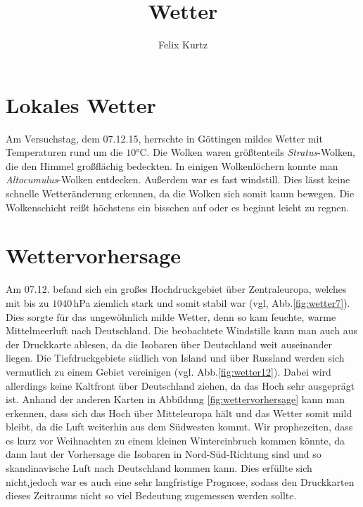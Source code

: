 \documentclass[12pt,a4paper,headinclude,bibtotoc]{scrartcl}
\begin{document}
\title{Wetter}
\author{Felix Kurtz}
\maketitle

\section{Lokales Wetter}
Am Versuchstag, dem 07.12.15, herrschte in Göttingen mildes Wetter mit Temperaturen rund um die $10\si{\celsius}$.
Die Wolken waren größtenteils \textit{Stratus}-Wolken, die den Himmel großflächig bedeckten.
In einigen Wolkenlöchern konnte man \textit{Altocumulus}-Wolken entdecken.
Außerdem war es fast windstill. 
Dies lässt keine schnelle Wetteränderung erkennen, da die Wolken sich somit kaum bewegen.
Die Wolkenschicht reißt höchstens ein bisschen auf oder es beginnt leicht zu regnen.

\section{Wettervorhersage}
Am 07.12. befand sich ein großes Hochdruckgebiet über Zentraleuropa, welches mit bis zu $1040\,$hPa ziemlich stark und somit stabil war (vgl, Abb.\ref{fig:wetter7}).
Dies sorgte für das ungewöhnlich milde Wetter, denn so kam feuchte, warme Mittelmeerluft nach Deutschland.
Die beobachtete Windstille kann man auch aus der Druckkarte ablesen, da die Isobaren über Deutschland weit auseinander liegen.
Die Tiefdruckgebiete südlich von Island und über Russland werden sich vermutlich zu einem Gebiet vereinigen (vgl. Abb.\ref{fig:wetter12}).
Dabei wird allerdings keine Kaltfront über Deutschland ziehen, da das Hoch sehr ausgeprägt ist.
Anhand der anderen Karten in Abbildung \ref{fig:wettervorhersage} kann man erkennen, dass sich das Hoch über Mitteleuropa hält und das Wetter somit mild bleibt, da die Luft weiterhin aus dem Südwesten kommt.
Wir prophezeiten, dass es kurz vor Weihnachten zu einem kleinen Wintereinbruch kommen könnte, da dann laut der Vorhersage die Isobaren in Nord-Süd-Richtung sind und so skandinavische Luft nach Deutschland kommen kann.
Dies erfüllte sich nicht,jedoch war es auch eine sehr langfristige Prognose, sodass den Druckkarten dieses Zeitraums nicht so viel Bedeutung zugemessen werden sollte.
\end{document}

